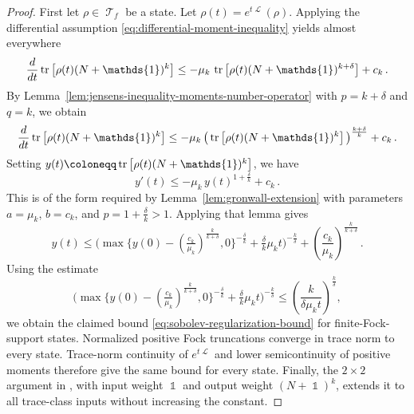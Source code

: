 \documentclass[11pt]{article}
\theoremstyle{myplain}
\theoremstyle{mydefinition}
\theoremstyle{remark}
\DeclareMathOperator{\cL}{\mathcal{L}}
\DeclareMathOperator{\cT}{\mathcal{T}}
\DeclareMathOperator{\1}{\mathds{1}}
\newcommand{\tr}[1][]{\operatorname{tr}%
  \ifx#1\empty \else \left[ #1 \right] \fi}
\begin{document}
        \begin{proof}
            First let $\rho\in\cT_f$ be a state. Let $\rho(t) = e^{t\cL}(\rho)$. Applying the differential assumption \eqref{eq:differential-moment-inequality} yields almost everywhere
            \begin{equation*}
                \frac{d}{dt} \tr[\rho(t) (N + \1)^k] \le - \mu_k \, \tr[\rho(t) (N + \1)^{k + \delta}] + c_k \, .
            \end{equation*}
            By Lemma~\ref{lem:jensens-inequality-moments-number-operator} with $p = k + \delta$ and $q = k$, we obtain
            \begin{equation*}
                \frac{d}{dt} \tr[\rho(t) (N + \1)^k] \le - \mu_k \, \big( \tr[\rho(t) (N + \1)^k] \big)^{\frac{k + \delta}{k}} + c_k \, .
            \end{equation*}
            Setting $y(t) \coloneqq \tr[\rho(t) (N + \1)^k]$, we have
            \begin{equation*}
                y'(t) \le - \mu_k \, y(t)^{1 + \frac{\delta}{k}} + c_k \, .
            \end{equation*}
            This is of the form required by Lemma~\ref{lem:gronwall-extension} with parameters $a = \mu_k$, $b = c_k$, and $p = 1 + \frac{\delta}{k} > 1$. Applying that lemma gives
            \begin{equation*}
                y(t) \le \big(\max\{ y(0) - (\tfrac{c_k}{\mu_k})^{\frac{k}{k + \delta}}, 0 \}^{-\frac{\delta}{k}} + \tfrac{\delta}{k} \mu_k t \big)^{-\frac{k}{\delta}} + \left( \frac{c_k}{\mu_k} \right)^{\frac{k}{k + \delta}}\,.
            \end{equation*}
            Using the estimate
            \begin{equation*}
                \big( \max\{ y(0) - (\tfrac{c_k}{\mu_k})^{\frac{k}{k + \delta}}, 0 \}^{-\frac{\delta}{k}} + \tfrac{\delta}{k} \mu_k t \big)^{-\frac{k}{\delta}}\le \left( \frac{k}{\delta \mu_k t} \right)^{\frac{k}{\delta}} ,
            \end{equation*}
            we obtain the claimed bound \eqref{eq:sobolev-regularization-bound} for finite-Fock-support states. Normalized positive Fock truncations converge in trace norm to every state. Trace-norm continuity of $e^{t\cL}$ and lower semicontinuity of positive moments therefore give the same bound for every state. Finally, the $2\times2$ argument in \cite[proof of Thm.~4.1.1]{Moebus.2025thesis}, with input weight $\1$ and output weight $(N + \1)^k$, extends it to all trace-class inputs without increasing the constant.
        \end{proof}
        
\end{document}
